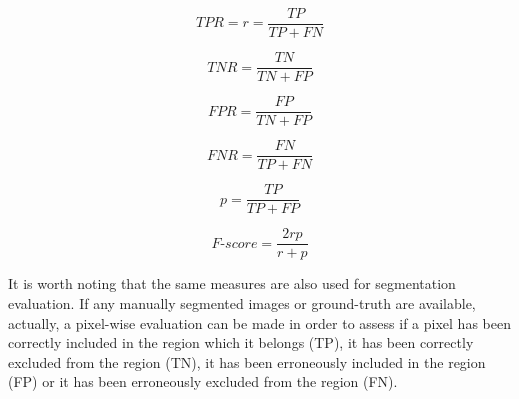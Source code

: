 \documentclass[final,a4paper,12pt,english]{UnicaPhdThesis3}
\begin{document}
	\begin{equation}\label{TPR}
	TPR = r = \frac{TP}{TP + FN}	
	\end{equation}
	
	\begin{equation}\label{TNR}
	TNR = \frac{TN}{TN + FP}	
	\end{equation}
	
	\begin{equation}\label{FPR}
	FPR= \frac{FP}{TN + FP}	
	\end{equation}
	
	\begin{equation}\label{FNR}
	FNR= \frac{FN}{TP + FN}	
	\end{equation}
	
	\begin{equation}\label{precision}
	p = \frac{TP}{TP + FP}	
	\end{equation}
	
	\begin{equation}\label{Fmeasure}
	F\mbox{-}score = \frac{2rp}{r + p}	
	\end{equation}
	
	It is worth noting that the same measures are also used for segmentation evaluation. If any manually segmented images or ground-truth are available, actually, a pixel-wise evaluation can be made in order to assess if a pixel has been correctly included in the region which it belongs (TP), it has been correctly excluded from the region (TN), it has been erroneously included in the region (FP) or it has been erroneously excluded from the region (FN).
	
\end{document}
